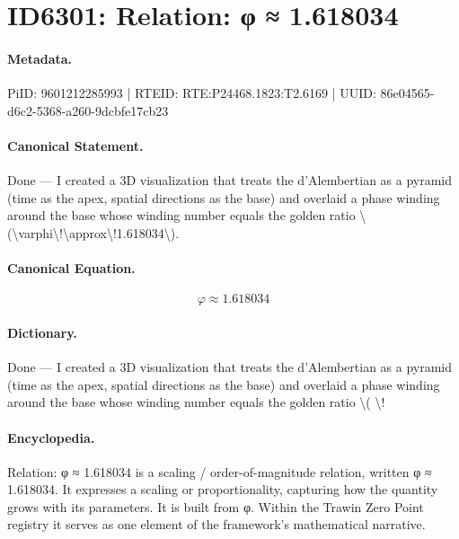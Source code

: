 \section*{ID6301: Relation: φ ≈ 1.618034}
\paragraph{Metadata.}
PiID: 9601212285993 | RTEID: RTE:P24468.1823:T2.6169 | UUID: 86e04565-d6c2-5368-a260-9dcbfe17cb23

\paragraph{Canonical Statement.}
Done — I created a 3D visualization that treats the d’Alembertian as a pyramid (time as the apex, spatial directions as the base) and overlaid a phase winding around the base whose winding number equals the golden ratio \textbackslash{}(\textbackslash{}varphi\textbackslash{}!\textbackslash{}approx\textbackslash{}!1.618034\textbackslash{}).

\paragraph{Canonical Equation.}
\[
\varphi\!\approx\!1.618034
\]

\paragraph{Dictionary.}
Done — I created a 3D visualization that treats the d’Alembertian as a pyramid (time as the apex, spatial directions as the base) and overlaid a phase winding around the base whose winding number equals the golden ratio \textbackslash{}( \textbackslash{}!

\paragraph{Encyclopedia.}
Relation: φ ≈ 1.618034 is a scaling / order-of-magnitude relation, written φ ≈ 1.618034. It expresses a scaling or proportionality, capturing how the quantity grows with its parameters. It is built from φ. Within the Trawin Zero Point registry it serves as one element of the framework's mathematical narrative.
